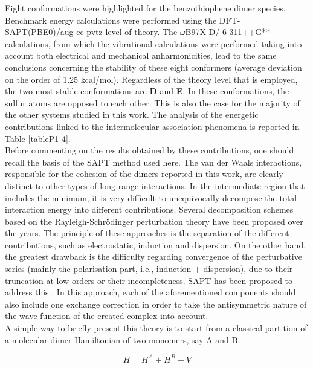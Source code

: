 		
		Eight conformations were highlighted for the benzothiophene dimer species. Benchmark energy calculations were performed using the DFT-SAPT(PBE0)/aug-cc pvtz level of theory. The $\omega$B97X-D/ 6-311++G** calculations, from which the vibrational calculations were performed taking into account both electrical and mechanical anharmonicities, lead to the same conclusions concerning the stability of these eight conformers (average deviation on the order of 1.25 kcal/mol). Regardless of the theory level that is employed, the two most stable conformations are \textbf{D} and \textbf{E}. In these conformations, the sulfur atoms are opposed to each other. This is also the case for the majority of the other systems studied in this work. The analysis of the energetic contributions linked to the intermolecular association phenomena is reported in Table \ref{tableP1-4}.\\
		
		Before commenting on the results obtained by these contributions, one should recall the basis of the SAPT method used here. The van der Waals interactions, responsible for the cohesion of the dimers reported in this work, are clearly distinct to other types of long-range interactions. In the intermediate region that includes the minimum, it is very difficult to unequivocally decompose the total interaction energy into different contributions. Several decomposition schemes based on the Rayleigh-Schr\"{o}dinger perturbation theory have been proposed over the years. The principle of these approaches is the separation of the different contributions, such as electrostatic, induction and dispersion. On the other hand, the greatest drawback is the difficulty regarding convergence of the perturbative series (mainly the polarisation part, i.e., induction + dispersion), due to their truncation at low orders or their incompleteness. SAPT has been proposed to address this \cite{jeziorski1994perturbation}. In this approach, each of the aforementioned components should also include one exchange correction in order to take the antisymmetric nature of the wave function of the created complex into account.\\ 
		
		A simple way to briefly present this theory is to start from a classical partition of a molecular dimer Hamiltonian of two monomers, say A and B:
		
		\begin{equation}
		H = H^{A} + H^{B} + V
		\end{equation}
		

